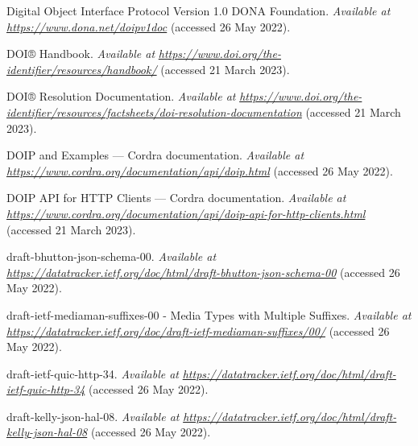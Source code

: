 \begin{CSLReferences}{1}{0}
\leavevmode{}%
Digital Object Interface Protocol Version 1.0 \textbar{} DONA Foundation. \emph{Available at} \href{https://www.dona.net/doipv1doc}{\emph{https://www.dona.net/doipv1doc}} (accessed 26 May 2022).

\leavevmode{}%
DOI® Handbook. \emph{Available at} \href{https://www.doi.org/the-identifier/resources/handbook/}{\emph{https://www.doi.org/the-identifier/resources/handbook/}} (accessed 21 March 2023).

\leavevmode{}%
DOI® Resolution Documentation. \emph{Available at} \href{https://www.doi.org/the-identifier/resources/factsheets/doi-resolution-documentation}{\emph{https://www.doi.org/the-identifier/resources/factsheets/doi-resolution-documentation}} (accessed 21 March 2023).

\leavevmode{}%
DOIP and Examples --- Cordra documentation. \emph{Available at} \href{https://www.cordra.org/documentation/api/doip.html}{\emph{https://www.cordra.org/documentation/api/doip.html}} (accessed 26 May 2022).

\leavevmode{}%
DOIP API for HTTP Clients --- Cordra documentation. \emph{Available at} \href{https://www.cordra.org/documentation/api/doip-api-for-http-clients.html}{\emph{https://www.cordra.org/documentation/api/doip-api-for-http-clients.html}} (accessed 21 March 2023).

\leavevmode{}%
draft-bhutton-json-schema-00. \emph{Available at} \href{https://datatracker.ietf.org/doc/html/draft-bhutton-json-schema-00}{\emph{https://datatracker.ietf.org/doc/html/draft-bhutton-json-schema-00}} (accessed 26 May 2022).

\leavevmode{}%
draft-ietf-mediaman-suffixes-00 - Media Types with Multiple Suffixes. \emph{Available at} \href{https://datatracker.ietf.org/doc/draft-ietf-mediaman-suffixes/00/}{\emph{https://datatracker.ietf.org/doc/draft-ietf-mediaman-suffixes/00/}} (accessed 26 May 2022).

\leavevmode{}%
draft-ietf-quic-http-34. \emph{Available at} \href{https://datatracker.ietf.org/doc/html/draft-ietf-quic-http-34}{\emph{https://datatracker.ietf.org/doc/html/draft-ietf-quic-http-34}} (accessed 26 May 2022).

\leavevmode{}%
draft-kelly-json-hal-08. \emph{Available at} \href{https://datatracker.ietf.org/doc/html/draft-kelly-json-hal-08}{\emph{https://datatracker.ietf.org/doc/html/draft-kelly-json-hal-08}} (accessed 26 May 2022).


\end{CSLReferences}
